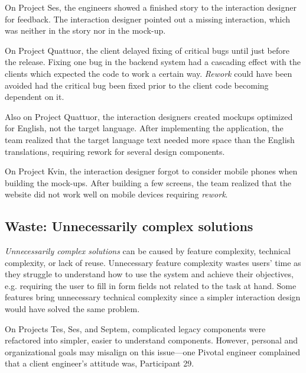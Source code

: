 On Project Ses, the engineers showed a finished story to the interaction designer for feedback. The interaction designer pointed out a missing interaction, which was neither in the story nor in the mock-up.

On Project Quattuor, the client delayed fixing of critical bugs until just before the release. Fixing one bug in the backend system had a cascading effect with the clients which expected the code to work a certain way. \textit{Rework} could have been avoided had the critical bug been fixed prior to the client code becoming dependent on it.

Also on Project Quattuor, the interaction designers created mockups optimized for English, not the target language. After implementing the application, the team realized that the target language text needed more space than the English translations, requiring rework for several design components. 

On Project Kvin, the interaction designer forgot to consider mobile phones when building the mock-ups. After building a few screens, the team realized that the website did not work well on mobile devices requiring \textit{rework}.
\subsection{Waste: Unnecessarily complex solutions}
\textit{Unnecessarily complex solutions} can be caused by feature complexity, technical complexity, or lack of reuse. Unnecessary feature complexity wastes users' time as they struggle to understand how to use the system and achieve their objectives, e.g. requiring the user to fill in form fields not related to the task at hand. Some features bring unnecessary technical complexity since a simpler interaction design would have solved the same problem. %

On Projects Tes, Ses, and Septem, complicated legacy components were refactored into simpler, easier to understand components. However, personal and organizational goals may misalign on this issue---one Pivotal engineer complained that a client engineer's attitude was,  \textemdash Participant 29.

